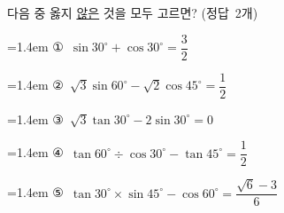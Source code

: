 다음 중 옳지 \underline{않은} 것을 모두 고르면? \mbox{(정답 2개)}
\par\medskip\par\noindent\hangindent=1.4em {\small ①}\ $\sin 30^\circ+\cos 30^\circ=\dfrac{3}{2}$\par\noindent\hangindent=1.4em {\small ②}\ $\sqrt{3}\sin 60^\circ-\sqrt{2}\cos 45^\circ=\dfrac{1}{2}$\par\noindent\hangindent=1.4em {\small ③}\ $\sqrt{3}\tan 30^\circ-2\sin 30^\circ=0$\par\noindent\hangindent=1.4em {\small ④}\ $\tan 60^\circ\div\cos 30^\circ-\tan 45^\circ=\dfrac{1}{2}$\par\noindent\hangindent=1.4em {\small ⑤}\ $\tan 30^\circ\times\sin 45^\circ-\cos 60^\circ=\dfrac{\sqrt{6}-3}{6}$\par\medskip
